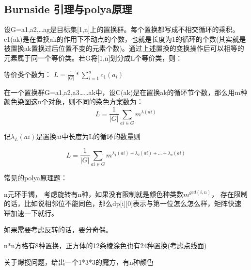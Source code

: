 \subsection{ Burnside 引理与polya原理}

设G={a1,a2,…ag}是目标集[1,n]上的置换群。每个置换都写成不相交循环的乘积。 c1(ak)是在置换ak的作用下不动点的个数，也就是长度为1的循环的个数(其实就是被置换ak置换过后位置不变的元素个数)。通过上述置换的变换操作后可以相等的元素属于同一个等价类。若G将[1,n]划分成L个等价类，则： 


等价类个数为： $L=\frac{1}{|G|}*\sum_{i=1}^{g}c_1(a_i) $

在一个置换群G={a1,a2,a3……ak}中，设C(ak)是在置换ak的循环节个数，那么用m种颜色染图这n个对象，则不同的染色方案数为： 
$$
L = \frac{1}{|G|}\sum_{ai∈G}m^{\lambda(ai)}$$

记$λ_L(ai)$是置换ai中长度为L的循环的数量则 
 
$$
L = \frac{1}{|G|}\sum_{ai \in G}m^{\lambda_1(ai)+\lambda_2(ai)+...+\lambda_n(ai)}
$$


常见的polya原理题：

n元环手镯， 考虑旋转有n种，如果没有限制就是颜色种类数$m^{gcd(i, n)}$， 存在限制的话，比如说相邻位不能同色，那么dp[i][0]表示与第一位怎么怎么样，矩阵快速幂加速一下就行。

如果需要考虑反转的话，要分奇偶。

n*n方格有8种置换，正方体的12条棱涂色也有24种置换(考虑点线面)

关于爆搜问题，给出一个1*3*3的魔方，有n种颜色

